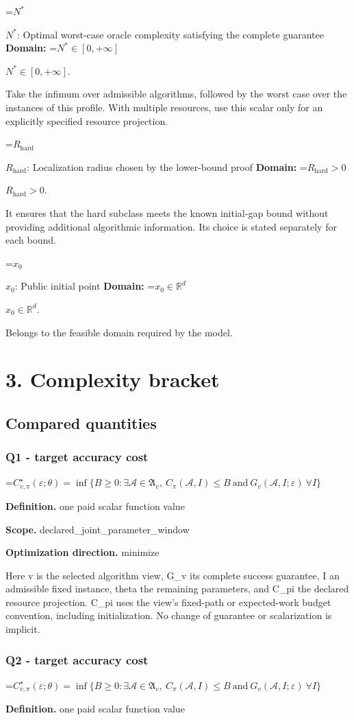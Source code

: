 \documentclass[10pt,a4paper]{article}
\newcommand{\AtlasMath}[1]{\par\begingroup\centering\setbox0=\hbox{$\displaystyle #1$}\ifdim\wd0>1.4\linewidth\typeout{ATLAS WIDE FORMULA: \the\wd0}\fi\ifdim\wd0>\linewidth\resizebox{\linewidth}{!}{\box0}\else\box0\fi\par\endgroup}
\newcommand{\AtlasInlineMath}[1]{\begingroup\setbox0=\hbox{$#1$}\ifdim\wd0>.4\linewidth\endgroup\AtlasMath{#1}\else\endgroup$#1$\fi}
\begin{document}
\AtlasInlineMath{N^*}: Optimal worst-case oracle complexity satisfying the complete guarantee \textbf{Domain:} \AtlasInlineMath{N^*\in[0,+\infty]}.

Take the infimum over admissible algorithms, followed by the worst case over the instances of this profile. With multiple resources, use this scalar only for an explicitly specified resource projection.

\AtlasInlineMath{R_{\mathrm{hard}}}: Localization radius chosen by the lower-bound proof \textbf{Domain:} \AtlasInlineMath{R_{\mathrm{hard}}>0}.

It ensures that the hard subclass meets the known initial-gap bound without providing additional algorithmic information. Its choice is stated separately for each bound.

\AtlasInlineMath{x_0}: Public initial point \textbf{Domain:} \AtlasInlineMath{x_0\in\mathbb{R}^d}.

Belongs to the feasible domain required by the model.

\section{3. Complexity bracket}
\subsection{Compared quantities}
\subsubsection{Q1 - target accuracy cost}
\AtlasMath{C^\star_{v,\pi}(\varepsilon;\theta)=\inf\{B\ge0:\exists\mathcal A\in\mathfrak A_v,\ C_\pi(\mathcal A,I)\le B\ \text{and}\ G_v(\mathcal A,I;\varepsilon)\ \forall I\}}
\textbf{Definition.} one paid scalar function value

\textbf{Scope.} declared\_joint\_parameter\_window

\textbf{Optimization direction.} minimize

Here v is the selected algorithm view, G\_v its complete success guarantee, I an admissible fixed instance, theta the remaining parameters, and C\_pi the declared resource projection. C\_pi uses the view's fixed-path or expected-work budget convention, including initialization. No change of guarantee or scalarization is implicit.

\subsubsection{Q2 - target accuracy cost}
\AtlasMath{C^\star_{v,\pi}(\varepsilon;\theta)=\inf\{B\ge0:\exists\mathcal A\in\mathfrak A_v,\ C_\pi(\mathcal A,I)\le B\ \text{and}\ G_v(\mathcal A,I;\varepsilon)\ \forall I\}}
\textbf{Definition.} one paid scalar function value
\end{document}
